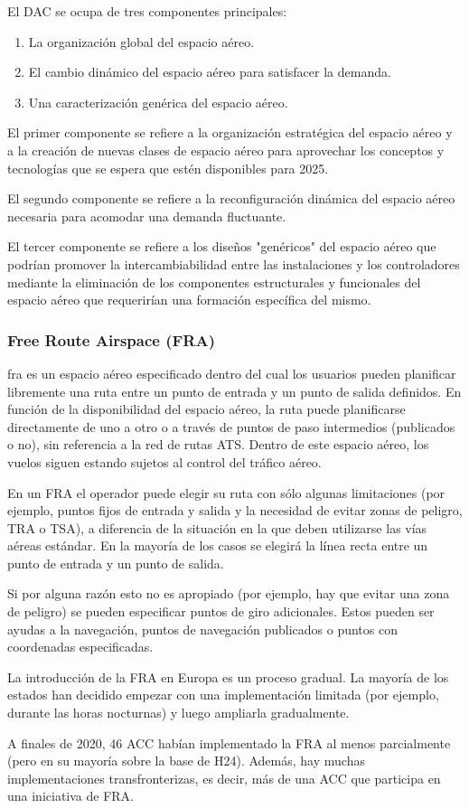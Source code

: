 El DAC se ocupa de tres componentes principales: 

\begin{enumerate}
    \item La organización global del espacio aéreo.
    \item El cambio dinámico del espacio aéreo para satisfacer la demanda.
    \item Una caracterización genérica del espacio aéreo.
\end{enumerate}

El primer componente se refiere a la organización estratégica del espacio aéreo y a la creación de nuevas clases de espacio aéreo para aprovechar los conceptos y tecnologías que se espera que estén disponibles para 2025. 

El segundo componente se refiere a la reconfiguración dinámica del espacio aéreo necesaria para acomodar una demanda fluctuante. 

El tercer componente se refiere a los diseños "genéricos" del espacio aéreo que podrían promover la intercambiabilidad entre las instalaciones y los controladores mediante la eliminación de los componentes estructurales y funcionales del espacio aéreo que requerirían una formación específica del mismo.

\subsubsection{Free Route Airspace (FRA)}

\acrfull{fra} es un espacio aéreo especificado dentro del cual los usuarios pueden planificar libremente una ruta entre un punto de entrada y un punto de salida definidos. En función de la disponibilidad del espacio aéreo, la ruta puede planificarse directamente de uno a otro o a través de puntos de paso intermedios (publicados o no), sin referencia a la red de rutas ATS. Dentro de este espacio aéreo, los vuelos siguen estando sujetos al control del tráfico aéreo.

En un FRA el operador puede elegir su ruta con sólo algunas limitaciones (por ejemplo, puntos fijos de entrada y salida y la necesidad de evitar zonas de peligro, TRA o TSA), a diferencia de la situación en la que deben utilizarse las vías aéreas estándar. En la mayoría de los casos se elegirá la línea recta entre un punto de entrada y un punto de salida. 

Si por alguna razón esto no es apropiado (por ejemplo, hay que evitar una zona de peligro) se pueden especificar puntos de giro adicionales. Estos pueden ser ayudas a la navegación, puntos de navegación publicados o puntos con coordenadas especificadas.

La introducción de la FRA en Europa es un proceso gradual. La mayoría de los estados han decidido empezar con una implementación limitada (por ejemplo, durante las horas nocturnas) y luego ampliarla gradualmente.

A finales de 2020, 46 ACC habían implementado la FRA al menos parcialmente (pero en su mayoría sobre la base de H24). Además, hay muchas implementaciones transfronterizas, es decir, más de una ACC que participa en una iniciativa de FRA.